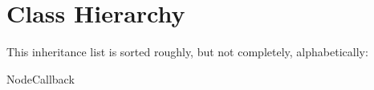 \section{Class Hierarchy}
This inheritance list is sorted roughly, but not completely, alphabetically\+:\begin{DoxyCompactList}
\item {}
\begin{DoxyCompactList}
\item {}
\end{DoxyCompactList}
\item Node\+Callback\begin{DoxyCompactList}
\item {}
\end{DoxyCompactList}
\end{DoxyCompactList}
